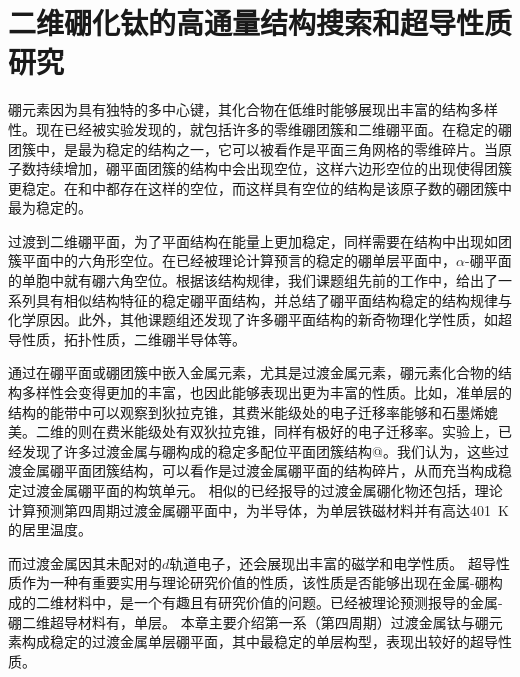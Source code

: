 \chapter{二维硼化钛的高通量结构搜索和超导性质研究}
\newcommand*{\rom}[1]{\uppercase\expandafter{\romannumeral #1\relax}}

硼元素因为具有独特的多中心键，其化合物在低维时能够展现出丰富的结构多样性。现在已经被实验发现的，就包括许多的零维硼团簇和二维硼平面。在稳定的硼团簇中，\cite{kiran2009origin}是最为稳定的结构之一，它可以被看作是平面三角网格的零维碎片。当原子数持续增加，硼平面团簇的结构中会出现空位，这样六边形空位的出现使得团簇更稳定。在和\cite{pham2014boron}中都存在这样的空位，而这样具有空位的结构是该原子数的硼团簇中最为稳定的。

过渡到二维硼平面，为了平面结构在能量上更加稳定，同样需要在结构中出现如团簇平面中的六角形空位。在已经被理论计算预言的稳定的硼单层平面中，$\alpha$-硼平面\cite{yang2008ab}的单胞中就有硼六角空位。根据该结构规律，我们课题组先前的工作中\cite{xu2017practical}，给出了一系列具有相似结构特征的稳定硼平面结构，并总结了硼平面结构稳定的结构规律与化学原因。此外，其他课题组还发现了许多硼平面结构的新奇物理化学性质，如超导性质\cite{penev2016can,zhao2016superconductivity}，拓扑性质\cite{feng2017dirac}，二维硼半导体\cite{xu2017two}等。

通过在硼平面或硼团簇中嵌入金属元素，尤其是过渡金属元素，硼元素化合物的结构多样性会变得更加的丰富，也因此能够表现出更为丰富的性质。比如，准单层的结构的能带中可以观察到狄拉克锥\cite{zhang2014prediction}，其费米能级处的电子迁移率能够和石墨烯媲美。二维的\cite{xie2014first}则在费米能级处有双狄拉克锥，同样有极好的电子迁移率。实验上，已经发现了许多过渡金属与硼构成的稳定多配位平面团簇结构@。我们认为，这些过渡金属硼平面团簇结构，可以看作是过渡金属硼平面的结构碎片，从而充当构成稳定过渡金属硼平面的构筑单元。
相似的已经报导的过渡金属硼化物还包括，理论计算预测第四周期过渡金属硼平面中，\cite{li2016global}为半导体，\cite{li2019room}为单层铁磁材料并有高达\SI{401}{\kelvin}的居里温度。

而过渡金属因其未配对的$d$轨道电子，还会展现出丰富的磁学和电学性质。
超导性质作为一种有重要实用与理论研究价值的性质，该性质是否能够出现在金属-硼构成的二维材料中，是一个有趣且有研究价值的问题。已经被理论预测报导的金属-硼二维超导材料有\cite{yan2019prediction}，单层\cite{wu2016lithium}。
本章主要介绍第一系（第四周期）过渡金属钛与硼元素构成稳定的过渡金属单层硼平面，其中最稳定的单层构型，表现出较好的超导性质。

